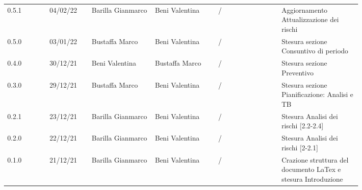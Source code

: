 {\begin{tabular}{p{0.10\linewidth}p{0.10\linewidth}p{0.15\linewidth}p{0.15\linewidth}p{0.15\linewidth}p{0.19\linewidth}}
	\rowcolor[RGB]{216, 235, 171}
	0.5.1 & 04/02/22 & Barilla Gianmarco& Beni Valentina & / & Aggiornamento Attualizzazione dei rischi\\
	\rowcolor[RGB]{233, 245, 206}
	0.5.0 & 03/01/22 & Bustaffa Marco& Beni Valentina & / & Stesura sezione Consuntivo di periodo\\
	\rowcolor[RGB]{216, 235, 171}
	0.4.0 & 30/12/21 & Beni Valentina& Bustaffa Marco & / & Stesura sezione Preventivo\\
	\rowcolor[RGB]{233, 245, 206}
	0.3.0 & 29/12/21 & Bustaffa Marco& Beni Valentina & / & Stesura sezione Pianificazione: Analisi e TB\\
	\rowcolor[RGB]{216, 235, 171}
	0.2.1 & 23/12/21 & Barilla Gianmarco& Beni Valentina & / & Stesura Analisi dei rischi [2.2-2.4]\\
	\rowcolor[RGB]{233, 245, 206}
	0.2.0 & 22/12/21 & Barilla Gianmarco & Beni Valentina & / & Stesura Analisi dei rischi [2-2.1]\\
	\rowcolor[RGB]{216, 235, 171}
	0.1.0 & 21/12/21 & Barilla Gianmarco & Beni Valentina & / & Crazione struttura del documento LaTex e stesura Introduzione\\	

\end{tabular}	
}
